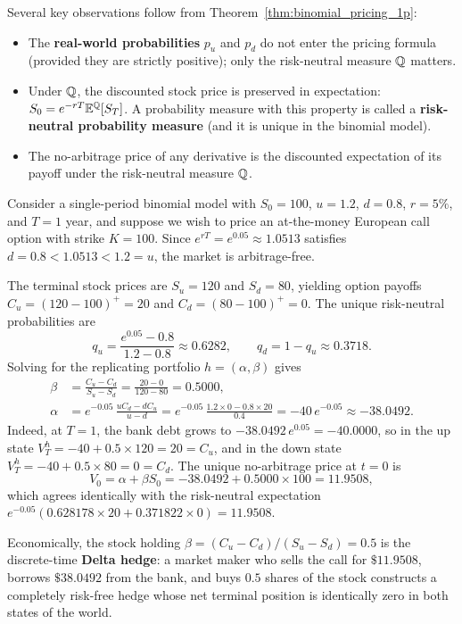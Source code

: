 Several key observations follow from Theorem~\ref{thm:binomial_pricing_1p}:
\begin{itemize}
    \item The \textbf{real-world probabilities} $p_u$ and $p_d$ do not enter the pricing formula (provided they are strictly positive); only the risk-neutral measure $\mathbb{Q}$ matters.
    \item Under $\mathbb{Q}$, the discounted stock price is preserved in expectation: $S_0 = e^{-rT} \mathbb{E}^{\mathbb{Q}}[S_T]$. A probability measure with this property is called a \textbf{risk-neutral probability measure} (and it is unique in the binomial model).
    \item The no-arbitrage price of any derivative is the discounted expectation of its payoff under the risk-neutral measure $\mathbb{Q}$.
\end{itemize}

\begin{example}
\label{ex:1p_replication_delta}
Consider a single-period binomial model with $S_0 = 100$, $u = 1.2$, $d = 0.8$, $r = 5\%$, and $T = 1$ year, and suppose we wish to price an at-the-money European call option with strike $K = 100$. Since $e^{rT} = e^{0.05} \approx 1.0513$ satisfies $d = 0.8 < 1.0513 < 1.2 = u$, the market is arbitrage-free.

The terminal stock prices are $S_u = 120$ and $S_d = 80$, yielding option payoffs $C_u = (120 - 100)^+ = 20$ and $C_d = (80 - 100)^+ = 0$. The unique risk-neutral probabilities are
\[
    q_u = \frac{e^{0.05} - 0.8}{1.2 - 0.8} \approx 0.6282, \qquad q_d = 1 - q_u \approx 0.3718.
\]
Solving for the replicating portfolio $h = (\alpha, \beta)$ gives
\begin{align*}
    \beta &= \frac{C_u - C_d}{S_u - S_d} = \frac{20 - 0}{120 - 80} = 0.5000, \\
    \alpha &= e^{-0.05}\,\frac{u C_d - d C_u}{u - d} = e^{-0.05}\,\frac{1.2 \times 0 - 0.8 \times 20}{0.4} = -40\, e^{-0.05} \approx -38.0492.
\end{align*}
Indeed, at $T = 1$, the bank debt grows to $-38.0492\, e^{0.05} = -40.0000$, so in the up state $V_T^h = -40 + 0.5 \times 120 = 20 = C_u$, and in the down state $V_T^h = -40 + 0.5 \times 80 = 0 = C_d$. The unique no-arbitrage price at $t = 0$ is
\[
    V_0 = \alpha + \beta S_0 = -38.0492 + 0.5000 \times 100 = 11.9508,
\]
which agrees identically with the risk-neutral expectation $e^{-0.05}(0.628178 \times 20 + 0.371822 \times 0) = 11.9508$.

Economically, the stock holding $\beta = (C_u - C_d)/(S_u - S_d) = 0.5$ is the discrete-time \textbf{Delta hedge}: a market maker who sells the call for $\$11.9508$, borrows $\$38.0492$ from the bank, and buys $0.5$ shares of the stock constructs a completely risk-free hedge whose net terminal position is identically zero in both states of the world.
\end{example}


